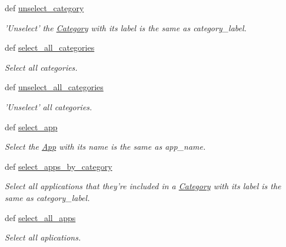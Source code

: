 \begin{CompactItemize}
def \hyperlink{classwinsollib_1_1Image_deae22f4a49d9bde6025459b46a49b4c}{unselect\_\-category}
\begin{CompactList}\small\item\em 'Unselect' the \hyperlink{classwinsollib_1_1Category}{Category} with its label is the same as {\em category\_\-label\/}. \item\end{CompactList}\item 
def \hyperlink{classwinsollib_1_1Image_7e61d4e92958164c68fde2569b5e3b87}{select\_\-all\_\-categories}
\begin{CompactList}\small\item\em Select all categories. \item\end{CompactList}\item 
def \hyperlink{classwinsollib_1_1Image_0f85fd5271bfbcf33e922efa13f3f142}{unselect\_\-all\_\-categories}
\begin{CompactList}\small\item\em 'Unselect' all categories. \item\end{CompactList}\item 
def \hyperlink{classwinsollib_1_1Image_b795fc8c3ac12e8bc2184ffb42945a1d}{select\_\-app}
\begin{CompactList}\small\item\em Select the \hyperlink{classwinsollib_1_1App}{App} with its name is the same as {\em app\_\-name\/}. \item\end{CompactList}\item 
def \hyperlink{classwinsollib_1_1Image_e1b1929c5caf01e71941ba8f9878a452}{select\_\-apps\_\-by\_\-category}
\begin{CompactList}\small\item\em Select all applications that they're included in a \hyperlink{classwinsollib_1_1Category}{Category} with its label is the same as {\em category\_\-label\/}. \item\end{CompactList}\item 
def \hyperlink{classwinsollib_1_1Image_51cdfffe314b134cada140ae639d27de}{select\_\-all\_\-apps}
\begin{CompactList}\small\item\em Select all aplications. \item\end{CompactList}\item 

\end{CompactItemize}
